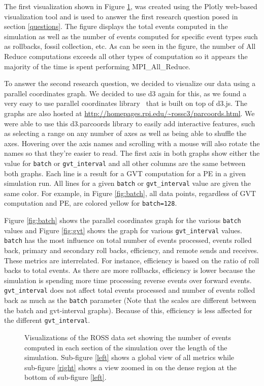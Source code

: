 \documentclass[12pt]{article}
\begin{document}
The first visualization shown in Figure \ref{Area}, was created using the Plotly \cite{Plotly} web-based visualization tool and is used to answer the first research question posed in section \ref{questions}. The figure displays the total events computed in the simulation as well as the number of events computed for specific event types such as rollbacks, fossil collection, etc. As can be seen in the figure, the number of All Reduce computations exceeds all other types of computation so it appears the majority of the time is spent performing MPI\_All\_Reduce. 

To answer the second research question, we decided to visualize our data using a parallel coordinates graph.  We decided to use d3 again for this, as we found a very easy to use parallel coordinates library~\cite{Chang} that is built on top of d3.js.  The graphs are also hosted at \url{http://homepages.rpi.edu/~rossc3/parcoords.html}. We were able to use this d3.parcoords library to easily add interactive features, such as selecting a range on any number of axes as well as being able to shuffle the axes. Hovering over the axis names and scrolling with a mouse will also rotate the names so that they're easier to read.  The first axis in both graphs show either the value for \texttt{batch} or \texttt{gvt\_interval} and all other columns are the same between both graphs.  Each line is a result for a GVT computation for a PE in a given simulation run.  All lines for a given \texttt{batch} or \texttt{gvt\_interval} value are given the same color.  For example, in Figure \ref{fig:batch}, all data points, regardless of GVT computation and PE, are colored yellow for \texttt{batch=128}.

Figure \ref{fig:batch} shows the parallel coordinates graph for the various \texttt{batch} values and Figure \ref{fig:gvt} shows the graph for various \texttt{gvt\_interval} values.     \texttt{batch} has the most influence on total number of events processed, events rolled back, primary and secondary roll backs,  efficiency, and remote sends and receives.  These metrics are interrelated. For instance, efficiency is based on the ratio of roll backs to total events.  As there are more rollbacks, efficiency is lower because the simulation is spending more time processing reverse events over forward events.  \texttt{gvt\_interval} does not affect total events processed and number of events rolled back as much as the \texttt{batch} parameter (Note that the scales are different between the batch and gvt-interval graphs).  Because of this, efficiency is less affected for the different \texttt{gvt\_interval}.  
\begin{figure}[!ht]
     \centering
     \caption{Visualizations of the ROSS data set showing the number of events computed in each section of the simulation over the length of the simulation. Sub-figure \ref{left} shows a global view of all metrics while sub-figure \ref{right} shows a view zoomed in on the dense region at the bottom of sub-figure \ref{left}.}
     \label{Area}
\end{figure}
\end{document}
